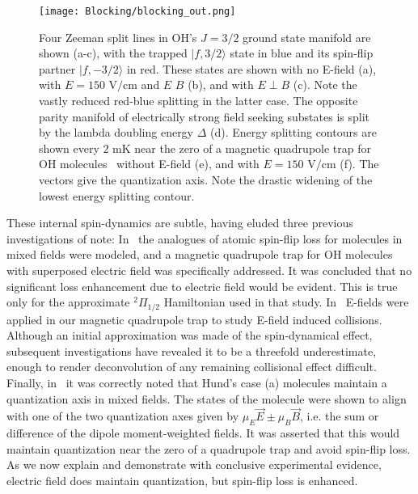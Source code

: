 \documentclass[%
 reprint,
 amsmath,amssymb,
 aps,
prl,
]{revtex4-1}
\newcommand{\epb}{{$E\!\perp\!B$}}
\begin{document}

\begin{figure}[tb]
\texttt{[image: Blocking/blocking\_out.png]}%
\caption{
Four Zeeman split lines in OH's $J=3/2$ ground state manifold are shown (a-c), with the trapped $|f,3/2\rangle$ state in blue and its spin-flip partner $|f,-3/2\rangle$ in red. These states are shown with no E-field (a), with $E=150\text{ V/cm}$ and $E\,$\raisebox{0.5px}{$\parallel$}$\,B$ (b), and with \epb{} (c). Note the vastly reduced red-blue splitting in the latter case. The opposite parity manifold of electrically strong field seeking substates is split by the lambda doubling energy $\Delta$ (d). Energy splitting contours are shown every $2\text{ mK}$ near the zero of a magnetic quadrupole trap for OH molecules~\cite{Stuhl2012uwave} without E-field (e), and with $E=150\text{ V/cm}$ (f). The vectors give the quantization axis. Note the drastic widening of the lowest energy splitting contour.
\label{fig:blocking}}
\end{figure}


These internal spin-dynamics are subtle, having eluded three previous investigations of note: In~\cite{Lara2008} the analogues of atomic spin-flip loss for molecules in mixed fields were modeled, and a magnetic quadrupole trap for OH molecules with superposed electric field was specifically addressed. It was concluded that no significant loss enhancement due to electric field would be evident. This is true only for the approximate $^2\Pi_{1/2}$ Hamiltonian used in that study. In~\cite{Stuhl2013} E-fields were applied in our magnetic quadrupole trap to study E-field induced collisions. Although an initial approximation was made of the spin-dynamical effect, subsequent investigations have revealed it to be a threefold underestimate, enough to render deconvolution of any remaining collisional effect difficult. Finally, in~\cite{Bohn2013} it was correctly noted that Hund's case (a) molecules maintain a quantization axis in mixed fields. The states of the molecule were shown to align with one of the two quantization axes given by $\mu_E\vec{E}\pm\mu_B\vec{B}$, i.e. the sum or difference of the dipole moment-weighted fields. It was asserted that this would maintain quantization near the zero of a quadrupole trap and avoid spin-flip loss. As we now explain and demonstrate with conclusive experimental evidence, electric field does maintain quantization, but spin-flip loss is enhanced.
\end{document}
